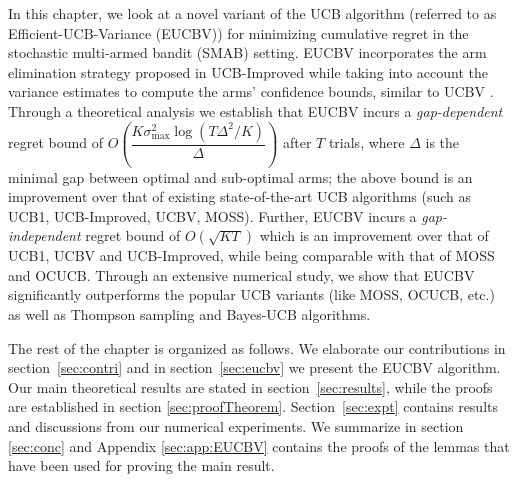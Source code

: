 In this chapter, we look at a novel variant of the UCB algorithm (referred to as Efficient-UCB-Variance (EUCBV)) for minimizing cumulative regret in the stochastic multi-armed bandit (SMAB) setting. EUCBV incorporates the arm elimination strategy proposed in UCB-Improved \citep{auer2010ucb} while taking into account the variance estimates to compute the arms' confidence bounds, similar to UCBV \citep{audibert2009exploration}. Through a theoretical analysis we establish that EUCBV incurs a \emph{gap-dependent} regret bound of {$O\left( \dfrac{K\sigma^2_{\max} \log (T\Delta^2 /K)}{\Delta}\right)$} after $T$ trials, where $\Delta$ is the minimal gap between optimal and sub-optimal arms; the above bound is an improvement over that of existing state-of-the-art UCB algorithms (such as UCB1, UCB-Improved, UCBV,  MOSS). Further, EUCBV incurs a \emph{gap-independent} regret bound of {$O\left(\sqrt{KT}\right)$}  which is an improvement over that of UCB1, UCBV and UCB-Improved, while being comparable with that of MOSS and OCUCB. Through an extensive numerical study, we show that EUCBV significantly outperforms the popular UCB variants (like MOSS, OCUCB, etc.) as well as Thompson sampling and Bayes-UCB algorithms. 

    The rest of the chapter is organized as follows. We elaborate our contributions in section~\ref{sec:contri} and in section~\ref{sec:eucbv} we present the  EUCBV algorithm. Our main theoretical results are stated in section~\ref{sec:results}, while the proofs are established in section \ref{sec:proofTheorem}. Section~\ref{sec:expt} contains results and discussions from our numerical experiments. We summarize in section \ref{sec:conc} and Appendix \ref{sec:app:EUCBV} contains the proofs of the lemmas that have been used for proving the main result.
    
